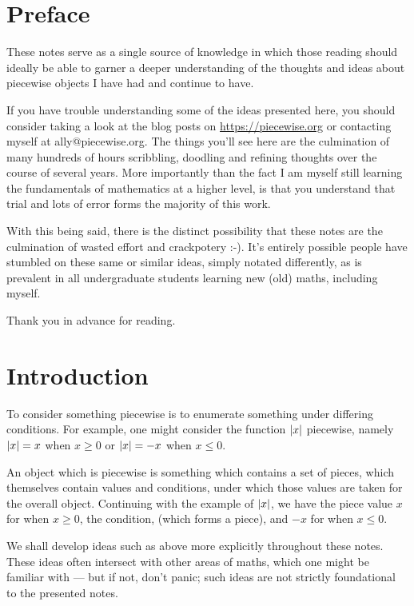 \section*{Preface}
These notes serve as a single source of knowledge in which those reading should ideally be able to garner a deeper understanding of the thoughts and ideas about piecewise objects I have had and continue to have.

If you have trouble understanding some of the ideas presented here, you should consider taking a look at the blog posts on \url{https://piecewise.org} or contacting myself at ally@piecewise.org. The things you'll see here are the culmination of many hundreds of hours scribbling, doodling and refining thoughts over the course of several years. More importantly than the fact I am myself still learning the fundamentals of mathematics at a higher level, is that you understand that trial and lots of error forms the majority of this work.

With this being said, there is the distinct possibility that these notes are the culmination of wasted effort and crackpotery :-). It's entirely possible people have stumbled on these same or similar ideas, simply notated differently, as is prevalent in all undergraduate students learning new (old) maths, including myself.

Thank you in advance for reading.

\section{Introduction}
To consider something piecewise is to enumerate something under differing conditions. For example, one might consider the function $\abs{x}$ piecewise, namely $\abs{x}=x$ when $x\geq 0$ or $\abs{x}=-x$ when $x\leq 0$.

An object which is piecewise is something which contains a set of pieces, which themselves contain values and conditions, under which those values are taken for the overall object. Continuing with the example of $\abs{x}$, we have the piece value $x$ for when $x\geq 0$, the condition, (which forms a piece), and $-x$ for when $x\leq 0$.

We shall develop ideas such as above more explicitly throughout these notes. These ideas often intersect with other areas of maths, which one might be familiar with --- but if not, don't panic; such ideas are not strictly foundational to the presented notes.


